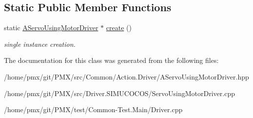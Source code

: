 \subsection*{Static Public Member Functions}
\begin{DoxyCompactItemize}
\item 
\mbox{\label{classAServoUsingMotorDriver_a2b9b877179c22982251a5e645f60f736}} 
static \hyperlink{classAServoUsingMotorDriver}{A\+Servo\+Using\+Motor\+Driver} $\ast$ \hyperlink{classAServoUsingMotorDriver_a2b9b877179c22982251a5e645f60f736}{create} ()
\begin{DoxyCompactList}\small\item\em single instance creation. \end{DoxyCompactList}\end{DoxyCompactItemize}


The documentation for this class was generated from the following files\+:\begin{DoxyCompactItemize}
\item 
/home/pmx/git/\+P\+M\+X/src/\+Common/\+Action.\+Driver/A\+Servo\+Using\+Motor\+Driver.\+hpp\item 
/home/pmx/git/\+P\+M\+X/src/\+Driver.\+S\+I\+M\+U\+C\+O\+C\+O\+S/Servo\+Using\+Motor\+Driver.\+cpp\item 
/home/pmx/git/\+P\+M\+X/test/\+Common-\/\+Test.\+Main/Driver.\+cpp\end{DoxyCompactItemize}
